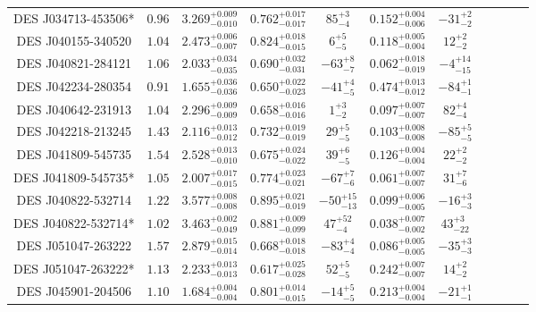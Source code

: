 \documentclass[tradiabstract,twocolumn]{aa}
\begin{document}
{\begin{longtable}{c c c c c c c c c c c}
DES J034713-453506* &          $0.96$ & $3.269^{+0.009}_{-0.010}$ & $0.762^{+0.017}_{-0.017}$ &    $85^{+3}_{-4}$ & $0.152^{+0.004}_{-0.006}$ &   $-31^{+2}_{-2}$ \\
DES J040155-340520 &           $1.04$ & $2.473^{+0.006}_{-0.007}$ & $0.824^{+0.018}_{-0.015}$ &     $6^{+5}_{-5}$ & $0.118^{+0.005}_{-0.004}$ &    $12^{+2}_{-2}$ \\
DES J040821-284121 &           $1.06$ & $2.033^{+0.034}_{-0.035}$ & $0.690^{+0.032}_{-0.031}$ &   $-63^{+8}_{-7}$ & $0.062^{+0.018}_{-0.019}$ &  $-4^{+14}_{-15}$ \\
DES J042234-280354 &           $0.91$ & $1.655^{+0.036}_{-0.036}$ & $0.650^{+0.022}_{-0.023}$ &   $-41^{+4}_{-5}$ & $0.474^{+0.013}_{-0.012}$ &   $-84^{+1}_{-1}$ \\
DES J040642-231913 &           $1.04$ & $2.296^{+0.009}_{-0.009}$ & $0.658^{+0.016}_{-0.016}$ &     $1^{+3}_{-2}$ & $0.097^{+0.007}_{-0.007}$ &    $82^{+4}_{-4}$ \\
DES J042218-213245 &           $1.43$ & $2.116^{+0.013}_{-0.012}$ & $0.732^{+0.019}_{-0.019}$ &    $29^{+5}_{-5}$ & $0.103^{+0.008}_{-0.008}$ &   $-85^{+5}_{-5}$ \\
DES J041809-545735 &           $1.54$ & $2.528^{+0.013}_{-0.010}$ & $0.675^{+0.024}_{-0.022}$ &    $39^{+6}_{-5}$ & $0.126^{+0.004}_{-0.004}$ &    $22^{+2}_{-2}$ \\
DES J041809-545735* &          $1.05$ & $2.007^{+0.017}_{-0.015}$ & $0.774^{+0.023}_{-0.021}$ &   $-67^{+7}_{-6}$ & $0.061^{+0.007}_{-0.007}$ &    $31^{+7}_{-6}$ \\
DES J040822-532714 &           $1.22$ & $3.577^{+0.008}_{-0.008}$ & $0.895^{+0.021}_{-0.019}$ & $-50^{+15}_{-13}$ & $0.099^{+0.006}_{-0.005}$ &   $-16^{+3}_{-3}$ \\
DES J040822-532714* &          $1.02$ & $3.463^{+0.002}_{-0.049}$ & $0.881^{+0.009}_{-0.099}$ &   $47^{+52}_{-4}$ & $0.038^{+0.007}_{-0.002}$ &   $43^{+3}_{-22}$ \\
DES J051047-263222 &           $1.57$ & $2.879^{+0.015}_{-0.014}$ & $0.668^{+0.018}_{-0.018}$ &   $-83^{+4}_{-4}$ & $0.086^{+0.005}_{-0.005}$ &   $-35^{+3}_{-3}$ \\
DES J051047-263222* &          $1.13$ & $2.233^{+0.013}_{-0.013}$ & $0.617^{+0.025}_{-0.028}$ &    $52^{+5}_{-5}$ & $0.242^{+0.007}_{-0.007}$ &    $14^{+2}_{-2}$ \\
DES J045901-204506 &           $1.10$ & $1.684^{+0.004}_{-0.004}$ & $0.801^{+0.014}_{-0.015}$ &   $-14^{+5}_{-5}$ & $0.213^{+0.004}_{-0.004}$ &   $-21^{+1}_{-1}$ \\

\end{longtable}}
\end{document}
